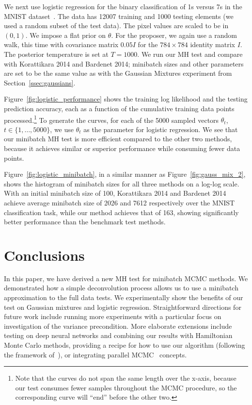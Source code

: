 \documentclass[twoside]{article} \usepackage{aistats2017}
\begin{document}
We next use logistic regression for the binary classification of 1s versus 7s in
the MNIST dataset~\citep{lecun-mnisthandwrittendigit-2010}. The data has 12007
training and 1000 testing elements (we used a random subset of the test data).
The pixel values are scaled to be in $(0,1)$.  We impose a flat prior on
$\theta$. For the proposer, we again use a random walk, this time with
covariance matrix $0.05I$ for the $784\times 784$ identity matrix $I$. The
posterior temperature is set at $T=1000$.  We run our MH test and compare with
Korattikara 2014 and Bardenet 2014; minibatch sizes and other parameters are set
to be the same value as with the Gaussian Mixtures experiment from
Section~\ref{ssec:gaussians}.

Figure~\ref{fig:logistic_performance} shows the training log likelihood and the
testing prediction accuracy, each as a function of the cumulative training data
points processed.\footnote{Note that the curves do not span the same length over
the x-axis, because our test consumes fewer samples throughout the MCMC
procedure, so the corresponding curve will ``end'' before the other two.} To
generate the curves, for each of the 5000 sampled vectors $\theta_t$,
$t\in\{1,\ldots,5000\}$, we use $\theta_t$ as the parameter for logistic
regression.  We see that our minibatch MH test is more efficient compared to the
other two methods, because it achieves similar or superior performance while
consuming fewer data points.

Figure~\ref{fig:logistic_minibatch}, in a similar manner as
Figure~\ref{fig:gauss_mix_2}, shows the histogram of minibatch sizes for all
three methods on a log-log scale. With an initial minibatch size of 100,
Korattikara 2014 and Bardenet 2014 achieve average minibatch size of 2026 and
7612 respectively over the MNIST classification task, while our method achieves
that of 163, showing significantly better performance than the benchmark test
methods.



\section{Conclusions}\label{sec:conclusion}

In this paper, we have derived a new MH test for minibatch MCMC methods. We
demonstrated how a simple deconvolution process allows us to use a minibatch
approximation to the full data tests. We experimentally show the benefits of our
test on Gaussian mixtures and logistic regression.  Straightforward directions
for future work include running more experiments with a particular focus on
investigation of the variance precondition.  More elaborate extensions include
testing on deep neural networks and combining our results with Hamiltonian Monte
Carlo methods, providing a recipe for how to use our algorithm (following the
framework of~\citet{sgmcmc_2015}), or integrating parallel
MCMC~\citep{conf/uai/AngelinoKWSA14,conf/icml/AhnSW14} concepts.
\end{document}
